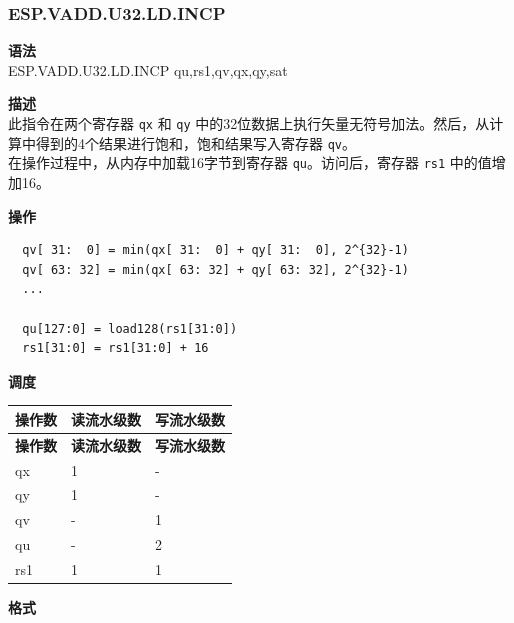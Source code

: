 \newpage

\newpage
\subsubsection{ESP.VADD.U32.LD.INCP}\label{instruction:ESPVADDU32LDINCP}
\textbf{语法}\\
ESP.VADD.U32.LD.INCP qu,rs1,qv,qx,qy,sat

\textbf{描述}\\
此指令在两个寄存器 \lstinline{qx} 和 \lstinline{qy} 中的32位数据上执行矢量无符号加法。然后，从计算中得到的4个结果进行饱和，饱和结果写入寄存器 \lstinline{qv}。\\ 在操作过程中，从内存中加载16字节到寄存器 \lstinline{qu}。访问后，寄存器 \lstinline{rs1} 中的值增加16。

\textbf{操作}\\
\begin{lstlisting}
  qv[ 31:  0] = min(qx[ 31:  0] + qy[ 31:  0], 2^{32}-1)
  qv[ 63: 32] = min(qx[ 63: 32] + qy[ 63: 32], 2^{32}-1)
  ...

  qu[127:0] = load128(rs1[31:0])
  rs1[31:0] = rs1[31:0] + 16
\end{lstlisting}

\textbf{调度}\\
\begin{longtable}[c]{|l|l|l|}
    \hline
    \rowcolor{lightgray}
    \textbf{操作数} & \textbf{读流水级数} & \textbf{写流水级数} \\\hline
    \endfirsthead
    \hline
    \rowcolor{lightgray}
     \textbf{操作数} & \textbf{读流水级数} & \textbf{写流水级数} \\\hline
    \endhead
    \hline
    \endfoot

    qx & 1 & - \\\hline
  qy & 1 & - \\\hline
     qv & - & 1 \\\hline
     qu & - & 2 \\\hline
     rs1 & 1 & 1

\end{longtable}

\textbf{格式}\\

